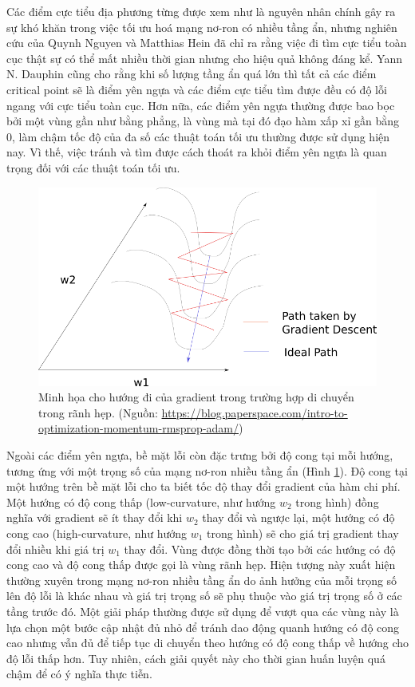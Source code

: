 Các điểm cực tiểu địa phương từng được xem như là nguyên nhân chính gây ra sự khó khăn trong việc tối ưu hoá mạng nơ-ron có nhiều tầng ẩn, nhưng nghiên cứu của Quynh Nguyen và Matthias Hein\cite{nguyen2017thelosssurface} đã chỉ ra rằng việc đi tìm cực tiểu toàn cục thật sự có thể mất nhiều thời gian nhưng cho hiệu quả không đáng kể. Yann N. Dauphin cũng cho rằng khi số lượng tầng ẩn quá lớn thì tất cả các điểm critical point sẽ là điểm yên ngựa và các điểm cực tiểu tìm được đều có độ lỗi ngang với cực tiểu toàn cục. Hơn nữa, các điểm yên ngựa thường được bao bọc bởi một vùng gần như bằng phẳng, là vùng mà tại đó đạo hàm xấp xỉ gần bằng 0, làm chậm tốc độ của đa số các thuật toán tối ưu thường được sử dụng hiện nay. Vì thế, việc tránh và tìm được cách thoát ra khỏi điểm yên ngựa là quan trọng đối với các thuật toán tối ưu.

\begin{figure}[htp]
\centering
\includegraphics[width=100 mm]{images/valley.png}
\caption{Minh họa cho hướng đi của gradient trong trường hợp di chuyển trong rãnh hẹp. (Nguồn: \url{https://blog.paperspace.com/intro-to-optimization-momentum-rmsprop-adam/})}
\label{fig:valley}
\end{figure}

Ngoài các điểm yên ngựa, bề mặt lỗi còn đặc trưng bởi độ cong tại mỗi hướng, tương ứng với một trọng số của mạng nơ-ron nhiều tầng ẩn (Hình \ref{fig:valley}). Độ cong tại một hướng trên bề mặt lỗi cho ta biết tốc độ thay đổi gradient của hàm chi phí. Một hướng có độ cong thấp (low-curvature, như hướng $w_2$ trong hình) đồng nghĩa với gradient sẽ ít thay đổi khi $w_2$ thay đổi và ngược lại, một hướng có độ cong cao (high-curvature, như hướng $w_1$ trong hình) sẽ cho giá trị gradient thay đổi nhiều khi giá trị $w_1$ thay đổi. Vùng được đồng thời tạo bởi các hướng có độ cong cao và độ cong thấp được gọi là vùng rãnh hẹp. Hiện tượng này xuất hiện thường xuyên trong mạng nơ-ron nhiều tầng ẩn do ảnh hưởng của mỗi trọng số lên độ lỗi là khác nhau và giá trị trọng số sẽ phụ thuộc vào giá trị trọng số ở các tầng trước đó. Một giải pháp thường được sử dụng để vượt qua các vùng này là lựa chọn một bước cập nhật đủ nhỏ để tránh dao động quanh hướng có độ cong cao nhưng vẫn đủ để tiếp tục di chuyển theo hướng có độ cong thấp về hướng cho độ lỗi thấp hơn. Tuy nhiên, cách giải quyết này cho thời gian huấn luyện quá chậm để có ý nghĩa thực tiễn.

